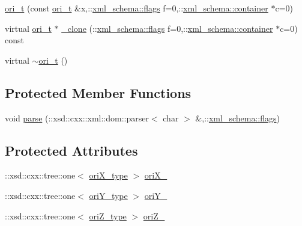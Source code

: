\begin{DoxyCompactItemize}
\item 
\hyperlink{classori__t_a72b53f599ee89c2caee595cc0966cf45}{ori\-\_\-t} (const \hyperlink{classori__t}{ori\-\_\-t} \&x,\-::\hyperlink{namespacexml__schema_a0612287d030cb2732d31a45b258fdc87}{xml\-\_\-schema\-::flags} f=0,\-::\hyperlink{namespacexml__schema_ada9aa30dc722e93ee2ed7243085402a5}{xml\-\_\-schema\-::container} $\ast$c=0)
\item 
virtual \hyperlink{classori__t}{ori\-\_\-t} $\ast$ \hyperlink{classori__t_a2d35bf90986a64146478af7232f3c72d}{\-\_\-clone} (\-::\hyperlink{namespacexml__schema_a0612287d030cb2732d31a45b258fdc87}{xml\-\_\-schema\-::flags} f=0,\-::\hyperlink{namespacexml__schema_ada9aa30dc722e93ee2ed7243085402a5}{xml\-\_\-schema\-::container} $\ast$c=0) const 
\item 
virtual \hyperlink{classori__t_a516385b1d25f706acaa19edec8a77ca3}{$\sim$ori\-\_\-t} ()
\end{DoxyCompactItemize}
\subsection*{Protected Member Functions}
\begin{DoxyCompactItemize}
\item 
void \hyperlink{classori__t_a988c7062a798e08f4c61845c0598c0c7}{parse} (\-::xsd\-::cxx\-::xml\-::dom\-::parser$<$ char $>$ \&,\-::\hyperlink{namespacexml__schema_a0612287d030cb2732d31a45b258fdc87}{xml\-\_\-schema\-::flags})
\end{DoxyCompactItemize}
\subsection*{Protected Attributes}
\begin{DoxyCompactItemize}
\item 
\-::xsd\-::cxx\-::tree\-::one$<$ \hyperlink{classori__t_a0d346be84e44760fbb97262b96c52110}{ori\-X\-\_\-type} $>$ \hyperlink{classori__t_a4b8bc23c9d2d4c4bcef1de372984b253}{ori\-X\-\_\-}
\item 
\-::xsd\-::cxx\-::tree\-::one$<$ \hyperlink{classori__t_ad04f9558bf4506128686a25e23817966}{ori\-Y\-\_\-type} $>$ \hyperlink{classori__t_a4e86990b10ec0dc34df44c3c944b30a7}{ori\-Y\-\_\-}
\item 
\-::xsd\-::cxx\-::tree\-::one$<$ \hyperlink{classori__t_ade8315fb919208a45ec58303232b842b}{ori\-Z\-\_\-type} $>$ \hyperlink{classori__t_aa9eb6ef9dc42db7707b805c8624012cb}{ori\-Z\-\_\-}
\end{DoxyCompactItemize}



